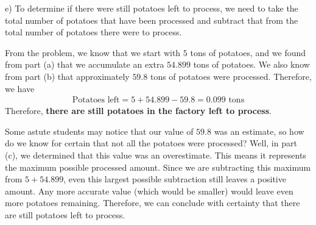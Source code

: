 \begin{tcolorbox}[solution]
\begin{tcolorbox}[interesting]
    \end{tcolorbox} \vspace{5.5pt}
    e) To determine if there were still potatoes left to process, we need to take the total number of potatoes that have been processed and subtract that from the total number of potatoes there were to process. \par
    \vspace{11pt}
    From the problem, we know that we start with $5$ tons of potatoes, and we found from part (a) that we accumulate an extra $54.899$ tons of potatoes. We also know from part (b) that approximately $59.8$ tons of potatoes were processed. Therefore, we have \begin{align*}
        \text{Potatoes left} = 5 + 54.899 - 59.8 = 0.099 \text{ tons}
    \end{align*}
    Therefore, \textbf{there are still potatoes in the factory left to process}.
    \begin{tcolorbox}[interesting]
        Some astute students may notice that our value of $59.8$ was an estimate, so how do we know for certain that not all the potatoes were processed? Well, in part (c), we determined that this value was an overestimate. This means it represents the maximum possible processed amount. Since we are subtracting this maximum from $5 + 54.899$, even this largest possible subtraction still leaves a positive amount. Any more accurate value (which would be smaller) would leave even more potatoes remaining. Therefore, we can conclude with certainty that there are still potatoes left to process.
    \end{tcolorbox}
\end{tcolorbox} \vspace{11pt}

